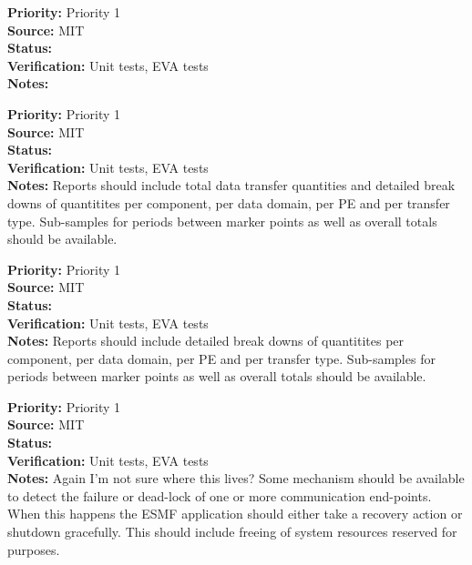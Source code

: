 \begin{reqlist}
{\bf Priority:} Priority 1 \\
{\bf Source:}  MIT \\
{\bf Status:}  \\
{\bf Verification:} Unit tests, EVA tests \\
{\bf Notes:}
\end{reqlist}

\begin{reqlist}
{\bf Priority:} Priority 1 \\
{\bf Source:}  MIT \\
{\bf Status:}  \\
{\bf Verification:} Unit tests, EVA tests \\
{\bf Notes:} Reports should include total data transfer quantities and detailed
break downs of quantitites per component, per data domain, per PE and per transfer type.
Sub-samples for periods between marker points as well as overall totals
should be available.
\end{reqlist}

\begin{reqlist}
{\bf Priority:} Priority 1 \\ 
{\bf Source:}  MIT \\
{\bf Status:}  \\
{\bf Verification:} Unit tests, EVA tests \\
{\bf Notes:} Reports should include detailed
break downs of quantitites per component, per data domain, per PE and per transfer type.
Sub-samples for periods between marker points as well as overall totals
should be available.
\end{reqlist}


\begin{reqlist}
{\bf Priority:} Priority 1 \\ 
{\bf Source:}  MIT \\
{\bf Status:}  \\
{\bf Verification:} Unit tests, EVA tests \\
{\bf Notes:} Again I'm not sure where this lives?
Some mechanism should be available to detect the failure or dead-lock of one or more
communication end-points. When this happens the ESMF application should either
take a recovery action or shutdown gracefully. This should include freeing of system resources
reserved for {\bf \shortname} purposes.
\end{reqlist}

